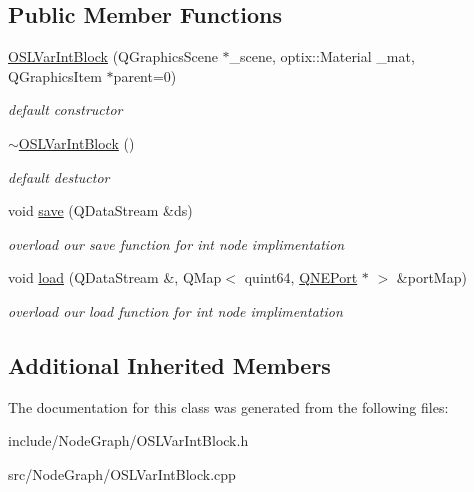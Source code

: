 \subsection*{Public Member Functions}
\begin{DoxyCompactItemize}
\item 
\hypertarget{class_o_s_l_var_int_block_a64d269693abfaab7529447642e54777e}{\hyperlink{class_o_s_l_var_int_block_a64d269693abfaab7529447642e54777e}{O\-S\-L\-Var\-Int\-Block} (Q\-Graphics\-Scene $\ast$\-\_\-scene, optix\-::\-Material \-\_\-mat, Q\-Graphics\-Item $\ast$parent=0)}\label{class_o_s_l_var_int_block_a64d269693abfaab7529447642e54777e}

\begin{DoxyCompactList}\small\item\em default constructor \end{DoxyCompactList}\item 
\hypertarget{class_o_s_l_var_int_block_a2c41389a736cba1d7058443e569546a0}{\hyperlink{class_o_s_l_var_int_block_a2c41389a736cba1d7058443e569546a0}{$\sim$\-O\-S\-L\-Var\-Int\-Block} ()}\label{class_o_s_l_var_int_block_a2c41389a736cba1d7058443e569546a0}

\begin{DoxyCompactList}\small\item\em default destuctor \end{DoxyCompactList}\item 
\hypertarget{class_o_s_l_var_int_block_ac2f03455e77ee05e50a1e2640389997d}{void \hyperlink{class_o_s_l_var_int_block_ac2f03455e77ee05e50a1e2640389997d}{save} (Q\-Data\-Stream \&ds)}\label{class_o_s_l_var_int_block_ac2f03455e77ee05e50a1e2640389997d}

\begin{DoxyCompactList}\small\item\em overload our save function for int node implimentation \end{DoxyCompactList}\item 
\hypertarget{class_o_s_l_var_int_block_ad568fcf28fd1fd7824970bf0fd040149}{void \hyperlink{class_o_s_l_var_int_block_ad568fcf28fd1fd7824970bf0fd040149}{load} (Q\-Data\-Stream \&, Q\-Map$<$ quint64, \hyperlink{class_q_n_e_port}{Q\-N\-E\-Port} $\ast$ $>$ \&port\-Map)}\label{class_o_s_l_var_int_block_ad568fcf28fd1fd7824970bf0fd040149}

\begin{DoxyCompactList}\small\item\em overload our load function for int node implimentation \end{DoxyCompactList}\end{DoxyCompactItemize}
\subsection*{Additional Inherited Members}


The documentation for this class was generated from the following files\-:\begin{DoxyCompactItemize}
\item 
include/\-Node\-Graph/O\-S\-L\-Var\-Int\-Block.\-h\item 
src/\-Node\-Graph/O\-S\-L\-Var\-Int\-Block.\-cpp\end{DoxyCompactItemize}

